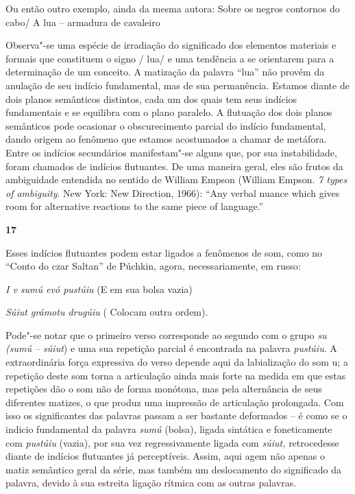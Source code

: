 Ou então outro exemplo, ainda da mesma autora: Sobre os negros contornos
do cabo/ A lua -- armadura de cavaleiro

Observa"-se uma espécie de irradiação do significado dos elementos
materiais e formais que constituem o signo / lua/ e uma tendência a se
orientarem para a determinação de um conceito. A matização da palavra
``lua'' não provém da anulação de seu indício fundamental, mas de sua
permanência. Estamos diante de dois planos semânticos distintos, cada um
dos quais tem seus indícios fundamentais e se equilibra com o plano
paralelo. A flutuação dos dois planos semânticos pode ocasionar o
obscurecimento parcial do indício fundamental, dando origem ao fenômeno
que estamos acostumados a chamar de metáfora. Entre os indícios
secundários manifestam"-se alguns que, por sua instabilidade, foram
chamados de indícios flutuantes. De uma maneira geral, eles são frutos
da ambiguidade entendida no sentido de William Empson (William Empson.
\emph{7 types of ambiguity}. New York: New Direction, 1966): ``Any
verbal nuance which gives room for alternative reactions to the same
piece of language.''

\textbf{17}

Esses indícios flutuantes podem estar ligados a fenômenos de som, como
no ``Conto do czar Saltan'' de Púchkin, agora, necessariamente, em
russo:

\emph{I v sumú evó pustúiu} (E em sua bolsa vazia)

\emph{Súiut grámotu drugúiu} ( Colocam outra ordem).

Pode"-se notar que o primeiro verso corresponde ao segundo com o grupo
\emph{su (sumú -- súiut}) e uma sua repetição parcial é encontrada na
palavra \emph{pustúiu}. A extraordinária força expressiva do verso
depende aqui da labialização do som {u}; a repetição deste som torna a
articulação ainda mais forte na medida em que estas repetições dão o som
não de forma monótona, mas pela alternância de seus diferentes matizes,
o que produz uma impressão de articulação prolongada. Com isso os
significantes das palavras passam a ser bastante deformados -- é como se
o indicio fundamental da palavra \emph{sumú} (bolsa), ligada sintática e
foneticamente com \emph{pustúiu} (vazia), por sua vez regressivamente
ligada com \emph{súiut,} retrocedesse diante de indícios flutuantes já
perceptíveis. Assim, aqui agem não apenas o matiz semântico geral da
série, mas também um deslocamento do significado da palavra, devido à
sua estreita ligação rítmica com as outras palavras.

